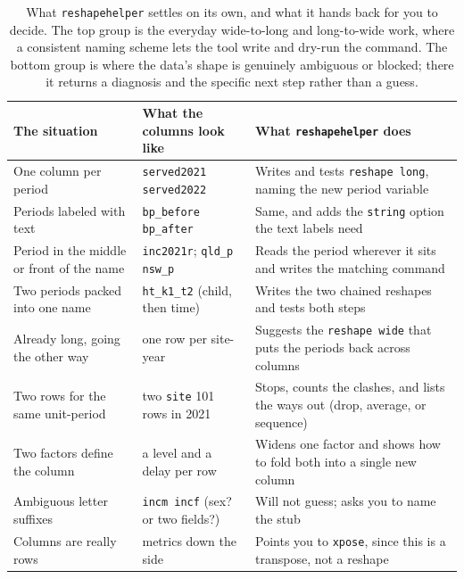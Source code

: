 \documentclass[
    a4paper,
    fontsize=10pt,
    twoside=true,
    numbers=noenddot,
]{kaobook}
\begin{document}
\begin{table}[htbp]
\centering
\caption[What reshapehelper settles and what it hands back]{What \texttt{reshapehelper} settles on its own, and what it hands back for you to decide. The top group is the everyday wide-to-long and long-to-wide work, where a consistent naming scheme lets the tool write and dry-run the command. The bottom group is where the data's shape is genuinely ambiguous or blocked; there it returns a diagnosis and the specific next step rather than a guess.}
\label{tab:reshapehelper}
{\footnotesize
\begin{tabular}{@{}p{4.5cm}p{4.0cm}p{6.2cm}@{}}
\toprule
\textbf{The situation} & \textbf{What the columns look like} & \textbf{What \texttt{reshapehelper} does} \\
\midrule
One column per period & \texttt{served2021 served2022} & Writes and tests \texttt{reshape long}, naming the new period variable \\
\addlinespace
Periods labeled with text & \texttt{bp\_before bp\_after} & Same, and adds the \texttt{string} option the text labels need \\
\addlinespace
Period in the middle or front of the name & \texttt{inc2021r}; \texttt{qld\_p nsw\_p} & Reads the period wherever it sits and writes the matching command \\
\addlinespace
Two periods packed into one name & \texttt{ht\_k1\_t2} (child, then time) & Writes the two chained reshapes and tests both steps \\
\addlinespace
Already long, going the other way & one row per site-year & Suggests the \texttt{reshape wide} that puts the periods back across columns \\
\midrule
Two rows for the same unit-period & two \texttt{site} 101 rows in 2021 & Stops, counts the clashes, and lists the ways out (drop, average, or sequence) \\
\addlinespace
Two factors define the column & a level and a delay per row & Widens one factor and shows how to fold both into a single new column \\
\addlinespace
Ambiguous letter suffixes & \texttt{incm incf} (sex? or two fields?) & Will not guess; asks you to name the stub \\
\addlinespace
Columns are really rows & metrics down the side & Points you to \texttt{xpose}, since this is a transpose, not a reshape \\
\bottomrule
\end{tabular}
}
\end{table}
\end{document}
